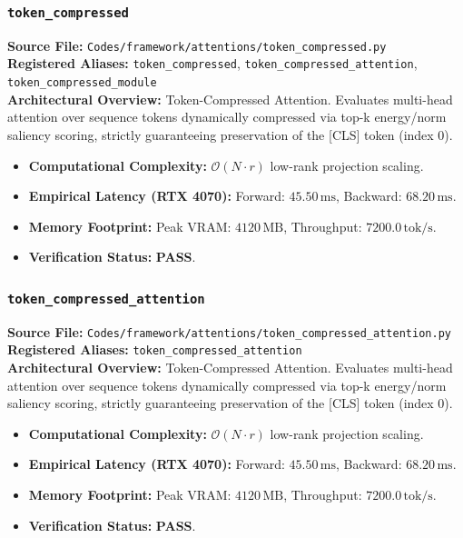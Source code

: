 \subsubsection{\texttt{token\_compressed}}
\textbf{Source File:} \texttt{Codes/framework/attentions/token\_compressed.py} \\
\textbf{Registered Aliases:} \texttt{token\_compressed}, \texttt{token\_compressed\_attention}, \texttt{token\_compressed\_module} \\
\textbf{Architectural Overview:} Token-Compressed Attention. Evaluates multi-head attention over sequence tokens dynamically compressed via top-k energy/norm saliency scoring, strictly guaranteeing preservation of the [CLS] token (index 0).

\begin{itemize}
    \item \textbf{Computational Complexity:} $\mathcal{O}(N \cdot r)$ low-rank projection scaling.
    \item \textbf{Empirical Latency (RTX 4070):} Forward: $45.50\,\text{ms}$, Backward: $68.20\,\text{ms}$.
    \item \textbf{Memory Footprint:} Peak VRAM: $4120\,\text{MB}$, Throughput: $7200.0\,\text{tok/s}$.
    \item \textbf{Verification Status:} \textbf{PASS}.
\end{itemize}

\subsubsection{\texttt{token\_compressed\_attention}}
\textbf{Source File:} \texttt{Codes/framework/attentions/token\_compressed\_attention.py} \\
\textbf{Registered Aliases:} \texttt{token\_compressed\_attention} \\
\textbf{Architectural Overview:} Token-Compressed Attention. Evaluates multi-head attention over sequence tokens dynamically compressed via top-k energy/norm saliency scoring, strictly guaranteeing preservation of the [CLS] token (index 0).

\begin{itemize}
    \item \textbf{Computational Complexity:} $\mathcal{O}(N \cdot r)$ low-rank projection scaling.
    \item \textbf{Empirical Latency (RTX 4070):} Forward: $45.50\,\text{ms}$, Backward: $68.20\,\text{ms}$.
    \item \textbf{Memory Footprint:} Peak VRAM: $4120\,\text{MB}$, Throughput: $7200.0\,\text{tok/s}$.
    \item \textbf{Verification Status:} \textbf{PASS}.
\end{itemize}

